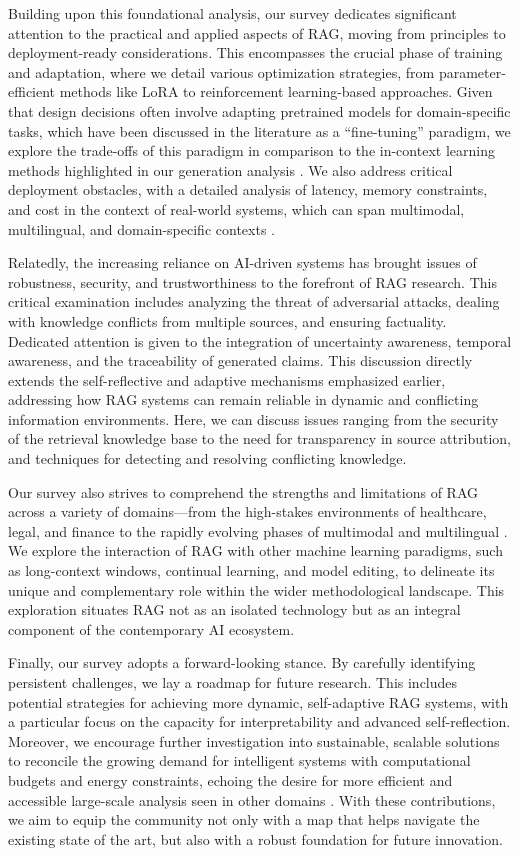 \documentclass[11pt]{article}
\begin{document}
Building upon this foundational analysis, our survey dedicates significant attention to the practical and applied aspects of RAG, moving from principles to deployment-ready considerations. This encompasses the crucial phase of training and adaptation, where we detail various optimization strategies, from parameter-efficient methods like LoRA to reinforcement learning-based approaches. Given that design decisions often involve adapting pretrained models for domain-specific tasks, which have been discussed in the literature as a ``fine-tuning'' paradigm, we explore the trade-offs of this paradigm in comparison to the in-context learning methods highlighted in our generation analysis \cite{ref45}. We also address critical deployment obstacles, with a detailed analysis of latency, memory constraints, and cost in the context of real-world systems, which can span multimodal, multilingual, and domain-specific contexts \cite{ref46}.

Relatedly, the increasing reliance on AI-driven systems has brought issues of robustness, security, and trustworthiness to the forefront of RAG research. This critical examination includes analyzing the threat of adversarial attacks, dealing with knowledge conflicts from multiple sources, and ensuring factuality. Dedicated attention is given to the integration of uncertainty awareness, temporal awareness, and the traceability of generated claims. This discussion directly extends the self-reflective and adaptive mechanisms emphasized earlier, addressing how RAG systems can remain reliable in dynamic and conflicting information environments. Here, we can discuss issues ranging from the security of the retrieval knowledge base to the need for transparency in source attribution, and techniques for detecting and resolving conflicting knowledge.

Our survey also strives to comprehend the strengths and limitations of RAG across a variety of domains---from the high-stakes environments of healthcare, legal, and finance to the rapidly evolving phases of multimodal and multilingual \cite{ref47}. We explore the interaction of RAG with other machine learning paradigms, such as long-context windows, continual learning, and model editing, to delineate its unique and complementary role within the wider methodological landscape. This exploration situates RAG not as an isolated technology but as an integral component of the contemporary AI ecosystem.

Finally, our survey adopts a forward-looking stance. By carefully identifying persistent challenges, we lay a roadmap for future research. This includes potential strategies for achieving more dynamic, self-adaptive RAG systems, with a particular focus on the capacity for interpretability and advanced self-reflection. Moreover, we encourage further investigation into sustainable, scalable solutions to reconcile the growing demand for intelligent systems with computational budgets and energy constraints, echoing the desire for more efficient and accessible large-scale analysis seen in other domains \cite{ref48}. With these contributions, we aim to equip the community not only with a map that helps navigate the existing state of the art, but also with a robust foundation for future innovation.
\end{document}
